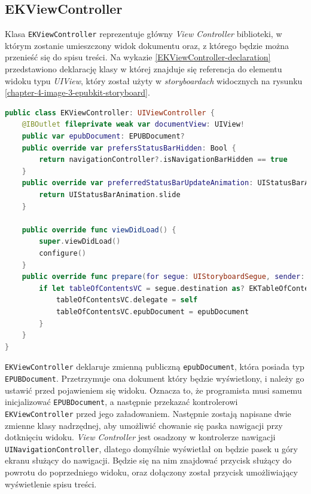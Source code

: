 \subsection{EKViewController}
\label{EKViewController}
Klasa \texttt{EKViewController} reprezentuje główny \textit{View Controller} biblioteki, w którym zostanie umieszczony widok dokumentu oraz, z którego będzie można przenieść się do spisu treści. Na wykazie \ref{EKViewController-declaration} przedstawiono deklarację klasy w której znajduje się referencja do elementu widoku typu \textit{UIView}, który został użyty w \textit{storyboardach} widocznych na rysunku \ref{chapter-4-image-3-epubkit-storyboard}.

\begin{lstlisting}[language=swift,caption={Deklaracja klasy texttt{EKViewController}},label=EKViewController-declaration]
public class EKViewController: UIViewController {
    @IBOutlet fileprivate weak var documentView: UIView!
    public var epubDocument: EPUBDocument?
    public override var prefersStatusBarHidden: Bool {
        return navigationController?.isNavigationBarHidden == true
    }
    public override var preferredStatusBarUpdateAnimation: UIStatusBarAnimation {
        return UIStatusBarAnimation.slide
    }

    public override func viewDidLoad() {
        super.viewDidLoad()
        configure()
    }
    public override func prepare(for segue: UIStoryboardSegue, sender: Any?) {
        if let tableOfContentsVC = segue.destination as? EKTableOfContentsViewController {
            tableOfContentsVC.delegate = self
            tableOfContentsVC.epubDocument = epubDocument
        }
    }
}
\end{lstlisting}

\texttt{EKViewController} deklaruje zmienną publiczną \texttt{epubDocument}, która posiada typ \texttt{EPUBDocument}. Przetrzymuje ona dokument który będzie wyświetlony, i należy go ustawić przed pojawieniem się widoku. Oznacza to, że programista musi samemu inicjalizować \texttt{EPUBDocument}, a następnie przekazać kontrolerowi \texttt{EKViewController} przed jego załadowaniem. Następnie zostają napisane dwie zmienne klasy nadrzędnej, aby umożliwić chowanie się paska nawigacji przy dotknięciu widoku. \textit{View Controller} jest osadzony w kontrolerze nawigacji \texttt{UINavigationController}, dlatego domyślnie wyświetlał on będzie pasek u góry ekranu służący do nawigacji. Będzie się na nim znajdować przycisk służący do powrotu do poprzedniego widoku, oraz dołączony został przycisk umożliwiający wyświetlenie spisu treści.

